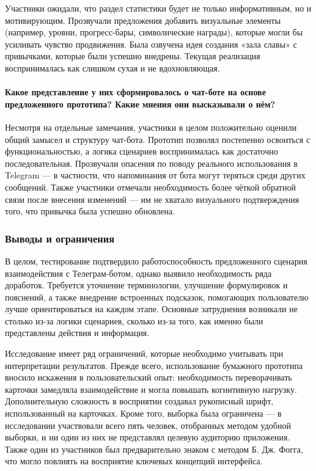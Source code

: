 \documentclass[pdflatex,sn-mathphys-num]{sn-jnl}%
\theoremstyle{thmstyleone}%
\theoremstyle{thmstyletwo}%
\theoremstyle{thmstylethree}%
\begin{document}
Участники ожидали, что раздел статистики будет не только информативным, но и мотивирующим. Прозвучали предложения добавить визуальные элементы (например, уровни, прогресс-бары, символические награды), которые могли бы усиливать чувство продвижения. Была озвучена идея создания «зала славы» с привычками, которые были успешно внедрены. Текущая реализация воспринималась как слишком сухая и не вдохновляющая.

\paragraph{Какое представление у них сформировалось о чат-боте на основе предложенного прототипа? Какие мнения они высказывали о нём?}

Несмотря на отдельные замечания, участники в целом положительно оценили общий замысел и структуру чат-бота. Прототип позволял постепенно освоиться с функциональностью, а логика сценариев воспринималась как достаточно последовательная. Прозвучали опасения по поводу реального использования в Telegram — в частности, что напоминания от бота могут теряться среди других сообщений. Также участники отмечали необходимость более чёткой обратной связи после внесения изменений — им не хватало визуального подтверждения того, что привычка была успешно обновлена.

\subsubsection{Выводы и ограничения}

В целом, тестирование подтвердило работоспособность предложенного сценария взаимодействия с Телеграм-ботом, однако выявило необходимость ряда доработок. Требуется уточнение терминологии, улучшение формулировок и пояснений, а также внедрение встроенных подсказок, помогающих пользователю лучше ориентироваться на каждом этапе. Основные затруднения возникали не столько из-за логики сценариев, сколько из-за того, как именно были представлены действия и информация.

Исследование имеет ряд ограничений, которые необходимо учитывать при интерпретации результатов. Прежде всего, использование бумажного прототипа вносило искажения в пользовательский опыт: необходимость переворачивать карточки замедляла взаимодействие и могла повышать когнитивную нагрузку. Дополнительную сложность в восприятии создавал рукописный шрифт, использованный на карточках. Кроме того, выборка была ограничена — в исследовании участвовали всего пять человек, отобранных методом удобной выборки, и ни один из них не представлял целевую аудиторию приложения. Также один из участников был предварительно знаком с методом Б. Дж. Фогга, что могло повлиять на восприятие ключевых концепций интерфейса.
\end{document}

